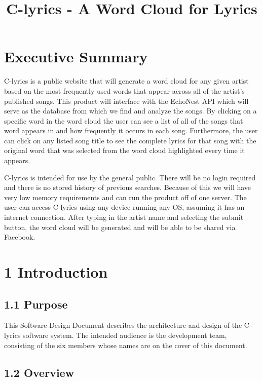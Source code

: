 \documentclass[]{article}
\author{}
\date{}
\begin{document}
\title{C-lyrics - A Word Cloud for Lyrics}

\section{Executive Summary}\label{executive-summary}

C-lyrics is a public website that will generate a word cloud for any
given artist based on the most frequently used words that appear across
all of the artist's published songs. This product will interface with
the EchoNest API which will serve as the database from which we find and
analyze the songs. By clicking on a specific word in the word cloud the
user can see a list of all of the songs that word appears in and how
frequently it occurs in each song. Furthermore, the user can click on
any listed song title to see the complete lyrics for that song with the
original word that was selected from the word cloud highlighted every
time it appears.

C-lyrics is intended for use by the general public. There will be no
login required and there is no stored history of previous searches.
Because of this we will have very low memory requirements and can run
the product off of one server. The user can access C-lyrics using any
device running any OS, assuming it has an internet connection. After
typing in the artist name and selecting the submit button, the word
cloud will be generated and will be able to be shared via Facebook.

\pagebreak

\section{1 Introduction}\label{introduction}

\subsection{1.1 Purpose}\label{purpose}

This Software Design Document describes the architecture and design of
the C-lyrics software system. The intended audience is the development
team, consisting of the six members whose names are on the cover of this
document.

\subsection{1.2 Overview}\label{overview}
\end{document}
